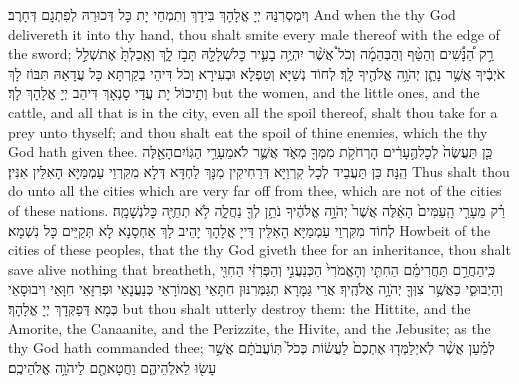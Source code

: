 {וְיִמְסְרִנַּהּ יְיָ אֱלָהָךְ בִּידָךְ וְתִמְחֵי יָת כָּל דְּכוּרַהּ לְפִתְגָם דְּחָרֶב׃}
{And when the \lord\space thy God delivereth it into thy hand, thou shalt smite every male thereof with the edge of the sword;}{}
{רַ֣ק הַ֠נָּשִׁ֠ים וְהַטַּ֨ף וְהַבְּהֵמָ֜ה וְכֹל֩ אֲשֶׁ֨ר יִהְיֶ֥ה בָעִ֛יר כׇּל\maqqaf שְׁלָלָ֖הּ תָּבֹ֣ז לָ֑ךְ וְאָֽכַלְתָּ֙ אֶת\maqqaf שְׁלַ֣ל אֹיְבֶ֔יךָ אֲשֶׁ֥ר נָתַ֛ן יְהֹוָ֥ה אֱלֹהֶ֖יךָ לָֽךְ׃}
{לְחוֹד נְשַׁיָּא וְטַפְלָא וּבְעִירָא וְכֹל דִּיהֵי בְקַרְתָּא כָּל עֲדָאַהּ תִּבּוֹז לָךְ וְתֵיכוֹל יָת עֲדַי סָנְאָךְ דִּיהַב יְיָ אֱלָהָךְ לָךְ׃}
{but the women, and the little ones, and the cattle, and all that is in the city, even all the spoil thereof, shalt thou take for a prey unto thyself; and thou shalt eat the spoil of thine enemies, which the \lord\space thy God hath given thee.}{}
{כֵּ֤ן תַּעֲשֶׂה֙ לְכׇל\maqqaf הֶ֣עָרִ֔ים הָרְחֹקֹ֥ת מִמְּךָ֖ מְאֹ֑ד אֲשֶׁ֛ר לֹא\maqqaf מֵעָרֵ֥י הַגּֽוֹיִם\maqqaf הָאֵ֖לֶּה הֵֽנָּה׃}
{כֵּן תַּעֲבֵיד לְכָל קִרְוַיָּא דְּרַחִיקִין מִנָּךְ לַחְדָּא דְּלָא מִקִּרְוֵי עַמְמַיָּא הָאִלֵּין אִנִּין׃}
{Thus shalt thou do unto all the cities which are very far off from thee, which are not of the cities of these nations.}{}
{רַ֗ק מֵעָרֵ֤י הָֽעַמִּים֙ הָאֵ֔לֶּה אֲשֶׁר֙ יְהֹוָ֣ה אֱלֹהֶ֔יךָ נֹתֵ֥ן לְךָ֖ נַחֲלָ֑ה לֹ֥א תְחַיֶּ֖ה כׇּל\maqqaf נְשָׁמָֽה׃}
{לְחוֹד מִקִּרְוֵי עַמְמַיָּא הָאִלֵּין דַּייָ אֱלָהָךְ יָהֵיב לָךְ אַחְסָנָא לָא תְּקַיֵּים כָּל נִשְׁמָא׃}
{Howbeit of the cities of these peoples, that the \lord\space thy God giveth thee for an inheritance, thou shalt save alive nothing that breatheth,}{}
{כִּֽי\maqqaf הַחֲרֵ֣ם תַּחֲרִימֵ֗ם הַחִתִּ֤י וְהָאֱמֹרִי֙ הַכְּנַעֲנִ֣י וְהַפְּרִזִּ֔י הַחִוִּ֖י וְהַיְבוּסִ֑י כַּאֲשֶׁ֥ר צִוְּךָ֖ יְהֹוָ֥ה אֱלֹהֶֽיךָ׃}
{אֲרֵי גַּמָּרָא תְגַּמְּרִנּוּן חִתָּאֵי וֶאֱמוֹרָאֵי כְּנַעֲנָאֵי וּפְרִזָּאֵי חִוָּאֵי וִיבוּסָאֵי כְּמָא דְּפַקְּדָךְ יְיָ אֱלָהָךְ׃}
{but thou shalt utterly destroy them: the Hittite, and the Amorite, the Canaanite, and the Perizzite, the Hivite, and the Jebusite; as the \lord\space thy God hath commanded thee;}{}
{לְמַ֗עַן אֲשֶׁ֨ר לֹֽא\maqqaf יְלַמְּד֤וּ אֶתְכֶם֙ לַעֲשׂ֔וֹת כְּכֹל֙ תּֽוֹעֲבֹתָ֔ם אֲשֶׁ֥ר עָשׂ֖וּ לֵאלֹֽהֵיהֶ֑ם וַחֲטָאתֶ֖ם לַיהֹוָ֥ה אֱלֹהֵיכֶֽם׃ \setuma }
